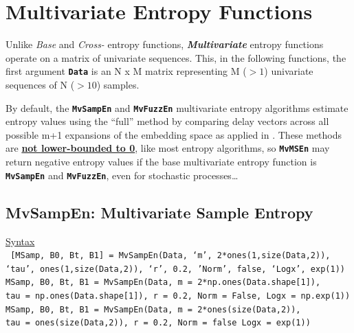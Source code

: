 \documentclass[12pt, a4paper, titlepage, openany]{book}
\begin{document}

\newpage
\section{Multivariate Entropy Functions}
\vspace{8cm}

\begin{tcolorbox}[colback=ehone!5, colframe=ehtwo!, title=\hypertarget{bidinote}{\textbf{Multivariate Data}}, label={BiBox}]
Unlike \textit{Base} and \textit{Cross-} entropy functions, \textit{\textbf{Multivariate}} entropy functions operate on a matrix of univariate sequences. This, in the following functions, the first argument \texttt{\textbf{Data}} is an N x M matrix representing M ($> 1$) univariate sequences of N ($> 10$) samples.
\end{tcolorbox}
\vspace{2cm}
\begin{tcolorbox}[colback=ehone!5, colframe=ehtwo!, title=\hypertarget{bidinote}{\textbf{ATTENTION}}, label={BiBox}]
By default, the \texttt{\textbf{MvSampEn}} and \texttt{\textbf{MvFuzzEn}} multivariate entropy algorithms estimate entropy values using the “full” method by comparing delay vectors across all possible m+1 expansions of the embedding space as applied in \cite{MvSamp1} \cite{MvSamp2} \cite{MvFuzz1}. These methods are \ul{\textbf{not lower-bounded to 0}}, like most entropy algorithms, so \texttt{\textbf{MvMSEn}} may return negative entropy values if the base multivariate entropy function is \texttt{\textbf{MvSampEn}} and \texttt{\textbf{MvFuzzEn}}, even for stochastic processes…
\end{tcolorbox}


\newpage
\subsection{\normalsize MvSampEn: \hspace{15mm} Multivariate Sample Entropy} \label{MvSampEn}
\noindent\ul{Syntax} \vspace{6mm} \\ \noindent \texttt{\footnotesize
[MSamp, B0, Bt, B1] = MvSampEn(Data, ‘m’, 2*ones(1,size(Data,2)), \\ \indent ‘tau’, ones(1,size(Data,2)), ‘r’, 0.2, 'Norm', false, ‘Logx’, exp(1))\\
 MSamp, B0, Bt, B1  = MvSampEn(Data, m = 2*np.ones(Data.shape[1]),  \\ \indent tau = np.ones(Data.shape[1]), r = 0.2, Norm = False, Logx = np.exp(1))\\
 MSamp, B0, Bt, B1  = MvSampEn(Data, m = 2*ones(size(Data,2)),  \\ \indent tau = ones(size(Data,2)), r = 0.2, Norm = false Logx = exp(1))}
 
\end{document}
